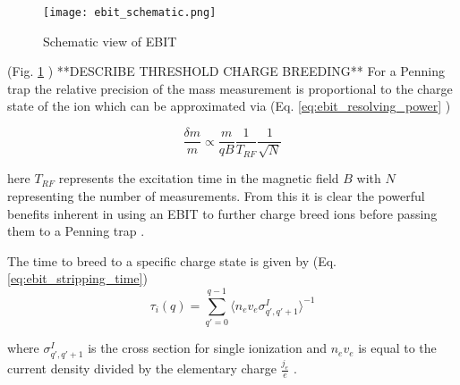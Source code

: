 \documentclass[cnatzke_thesis_proposal.tex]{subfiles}
\begin{document}
\begin{figure}[H]
  \begin{center}
    \texttt{[image: ebit\_schematic.png]}
  \end{center}
  \caption{Schematic view of EBIT \cite{PALFFY_THESIS}}
  \label{fig:schematic_ebit}
\end{figure}

(Fig. \ref{fig:schematic_ebit} )
**DESCRIBE  THRESHOLD CHARGE BREEDING**
For a Penning trap the relative precision of the mass measurement is proportional to the charge state of the ion which can be approximated via (Eq. \ref{eq:ebit_resolving_power} \cite{TITAN_EBIT_2010})


\begin{equation}
  \frac{\delta m}{m} \propto \frac{m}{qB} \frac{1}{T_{RF}} \frac{1}{\sqrt{N}}
  \label{eq:ebit_resolving_power}
\end{equation}

here $T_{RF}$ represents the excitation time in the magnetic field $B$ with $N$ representing the number of measurements.  From this it is clear the powerful benefits inherent in using an EBIT to further charge breed ions before passing them to a Penning trap \cite{TITAN_EBIT_2010}.

The time to breed to a specific charge state is given by (Eq. \ref{eq:ebit_stripping_time})
\begin{equation}
  \tau_{i}(q) = \sum_{q'=0}^{q-1}\langle n_e v_e \sigma^{I}_{q', q'+1} \rangle^{-1}
  \label{eq:ebit_stripping_time}
\end{equation}

where $\sigma^{I}_{q', q'+1}$ is the cross section for single ionization and $n_e v_e$ is equal to the current density divided by the elementary charge $\frac{j_e}{e}$ \cite{SPRINGER_1997}.
\end{document}

